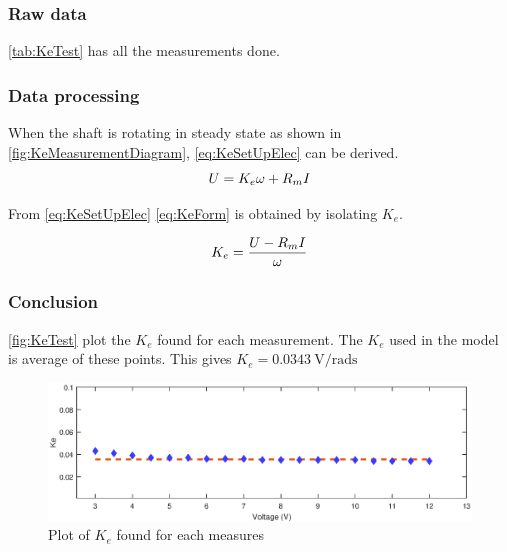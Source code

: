 \subsubsection*{Raw data}
\autoref{tab:KeTest} has all the measurements done.


\subsubsection*{Data processing}

When the shaft is rotating in steady state as shown in \autoref{fig:KeMeasurementDiagram}, \autoref{eq:KeSetUpElec} can be derived.
\begin{equation}
U=K_e\omega+R_m I \addunit{\volt}
\label{eq:KeSetUpElec}
\end{equation}
\startexplain
{}
\stopexplain

From \autoref{eq:KeSetUpElec} \autoref{eq:KeForm} is obtained by isolating $K_e$.

\begin{equation}
K_e=\frac{U-R_m I}{\omega} \addunit{\volt\per\radian\second}
\label{eq:KeForm}
\end{equation}

\subsubsection*{Conclusion}

\autoref{fig:KeTest} plot the $K_e$ found for each measurement. The $K_e$ used in the model is average of these points. This gives $K_e=\SI{0.0343}{\volt\per\radian\second}$

\begin{figure}[htbp]
	\centering
	\includegraphics[width=\textwidth]{figures/appendix/Motor&GearTests/PlotKe.eps}
	\caption{Plot of $K_e$ found for each measures}\label{fig:KeTest}
\end{figure}